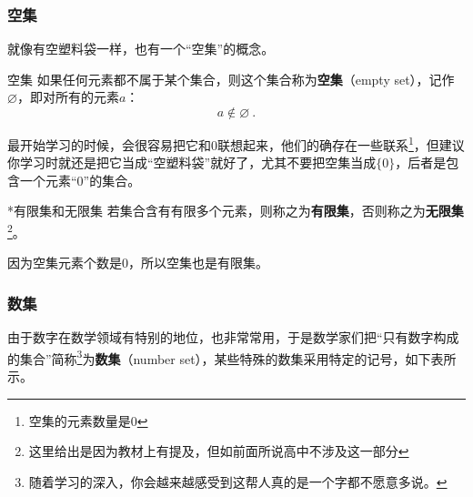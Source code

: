 
\subsubsection{空集}

就像有空塑料袋一样，也有一个“空集”的概念。

\begin{definition}{空集}
如果任何元素都不属于某个集合，则这个集合称为\textbf{空集}（empty set），记作 $\varnothing$，即对所有的元素$a$：
\begin{equation}
a\notin\varnothing~.
\end{equation}
\end{definition}

最开始学习的时候，会很容易把它和$0$联想起来，他们的确存在一些联系\footnote{空集的元素数量是0}，但建议你学习时就还是把它当成“空塑料袋”就好了，尤其不要把空集当成$\{0\}$，后者是包含一个元素“$0$”的集合。

\begin{definition}{*有限集和无限集}
若集合含有有限多个元素，则称之为\textbf{有限集}，否则称之为\textbf{无限集}\footnote{这里给出是因为教材上有提及，但如前面所说高中不涉及这一部分}。
\end{definition}

因为空集元素个数是0，所以空集也是有限集。

\subsubsection{数集}

由于数字在数学领域有特别的地位，也非常常用，于是数学家们把“只有数字构成的集合”简称\footnote{随着学习的深入，你会越来越感受到这帮人真的是一个字都不愿意多说。}为\textbf{数集}（number set），某些特殊的数集采用特定的记号，如下表所示。

